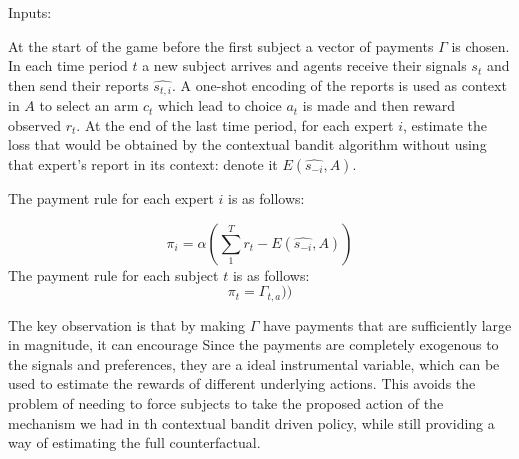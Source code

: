 \begin{mech}
Inputs:
 
 At the start of the game before the first subject a vector of payments $\Gamma$ is chosen.
In each time period $t$ a new subject arrives and agents receive their signals $s_t$ and then send their reports $\hat{s_{t,i}}$. A one-shot encoding of the reports is used as context in $A$ to select an arm $c_t$ which lead to choice $a_t$ is made and then reward observed $r_t$.
At the end of the last time period, for each expert $i$, estimate the loss that would be obtained by the contextual bandit algorithm without using that expert's report in its context: denote it $E(\hat{s_{-i}},A)$.



The payment rule for each expert $i$ is as follows:

\[
    \pi_i =  \alpha (\sum_1^T r_t -  E(\hat{s_{-i}},A))
\]
The payment rule for each subject $t$ is as follows:
\[
    \pi_t =  \Gamma_{t,a}))
\]


\end{mech}

The key observation is that by making $\Gamma$ have payments that are sufficiently large in magnitude, it can encourage 
Since the payments are completely exogenous to the signals and preferences, they are a ideal instrumental variable, which can be used to estimate the rewards of different underlying actions.
This avoids the problem of needing to force subjects to take the proposed action of the mechanism we had in th contextual bandit driven policy, while still providing a way of estimating the full counterfactual.









